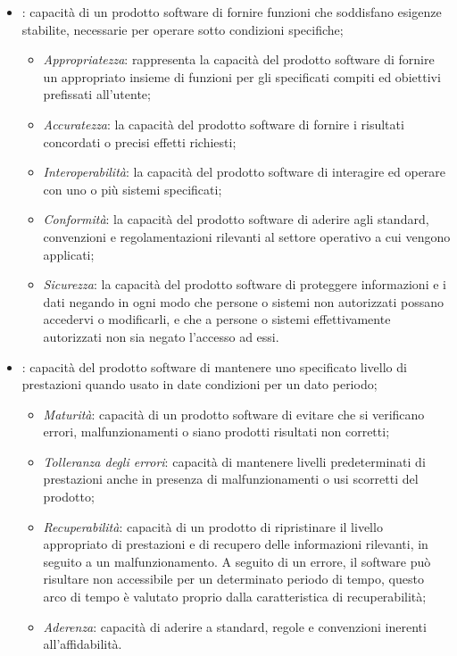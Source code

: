\begin{itemize}
	\item {}: capacità di un prodotto software di fornire funzioni che soddisfano esigenze stabilite, necessarie per operare sotto condizioni specifiche;
	\begin{itemize}
		\item \emph{Appropriatezza}: rappresenta la capacità del prodotto software di fornire un appropriato insieme di funzioni per gli specificati compiti ed obiettivi prefissati all'utente;
		\item \emph{Accuratezza}: la capacità del prodotto software di fornire i risultati concordati o precisi effetti richiesti;
		\item \emph{Interoperabilità}: la capacità del prodotto software di interagire ed operare con uno o più sistemi specificati;
		\item \emph{Conformità}: la capacità del prodotto software di aderire agli standard, convenzioni e regolamentazioni rilevanti al settore operativo a cui vengono applicati;
		\item \emph{Sicurezza}: la capacità del prodotto software di proteggere informazioni e i dati negando in ogni modo che persone o sistemi non autorizzati possano accedervi o modificarli, e che a persone o sistemi effettivamente autorizzati non sia negato l'accesso ad essi.
	\end{itemize}
	\item {}: capacità del prodotto software di mantenere uno specificato livello di prestazioni quando usato in date condizioni per un dato periodo;
	\begin{itemize}
		\item \emph{Maturità}: capacità di un prodotto software di evitare che si verificano errori, malfunzionamenti o siano prodotti risultati non corretti;
		\item \emph{Tolleranza degli errori}: capacità di mantenere livelli predeterminati di prestazioni anche in presenza di malfunzionamenti o usi scorretti del prodotto;
		\item \emph{Recuperabilità}: capacità di un prodotto di ripristinare il livello appropriato di prestazioni e di recupero delle informazioni rilevanti, in seguito a un malfunzionamento. A seguito di un errore, il software può risultare non accessibile per un determinato periodo di tempo, questo arco di tempo è valutato proprio dalla caratteristica di recuperabilità;
		\item \emph{Aderenza}: capacità di aderire a standard, regole e convenzioni inerenti all'affidabilità.

\end{itemize}
\end{itemize}
